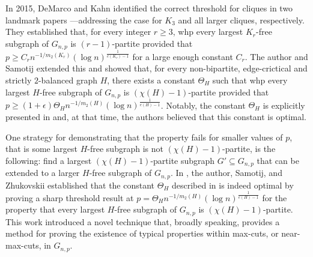 \documentclass[11pt,a4paper,oneside,reqno]{amsart}
\newcommand{\1}{\mathbbm{1}} %
\renewcommand{\ge}{\geqslant}
\begin{document}
In 2015, DeMarco and Kahn identified the correct threshold for cliques in two landmark papers \cite{DeMKah15Man, DeMKah15Tur}—addressing the case for $K_3$ and all larger cliques, respectively. They established that, for every integer $r \ge 3$, whp every largest $K_r$-free subgraph of $G_{n, p}$ is $(r-1)$-partite provided that $p \ge C_r n^{-1/m_2(K_r)} \left(\log n\right)^{\frac{1}{e(K_r)-1}}$ for a large enough constant $C_r$. The author and Samotij \cite{hoshen2023simonovits} extended this and showed that, for every non-bipartite, edge-crictical and strictly $2$-balanced graph $H$, there exists a constant $\Theta_H$ such that whp every largest $H$-free subgraph of $G_{n, p}$ is $(\chi(H)-1)$-partite provided that $p \ge (1+\epsilon) \Theta_H n^{-1/m_2(H)} \left(\log n\right)^{\frac{1}{e(H)-1}}$.
Notably, the constant $\Theta_H$ is explicitly presented in \cite{hoshen2023simonovits} and, at that time, the authors believed that this constant is optimal. 

One strategy for demonstrating that the property fails for smaller values of $p$, that is some largest $H$-free subgraph is not $(\chi(H)-1)$-partite, is the following: find a largest $(\chi(H)-1)$-partite subgraph $G' \subseteq G_{n, p}$ that can be extended to a larger $H$-free subgraph of $G_{n, p}$. 
In \cite{hoshen2024stabilitylargecutsrandom}, the author, Samotij, and Zhukovskii established that the constant $\Theta_H$ described in \cite{hoshen2023simonovits} is indeed optimal by proving a sharp threshold result at $p = \Theta_H n^{-1/m_2(H)} \left(\log n\right)^{\frac{1}{e(H)-1}}$ for the property that every largest $H$-free subgraph of $G_{n, p}$ is $(\chi(H)-1)$-partite. This work introduced a novel technique that, broadly speaking, provides a method for proving the existence of typical properties within max-cuts, or near-max-cuts, in $G_{n, p}$. 
\end{document}
